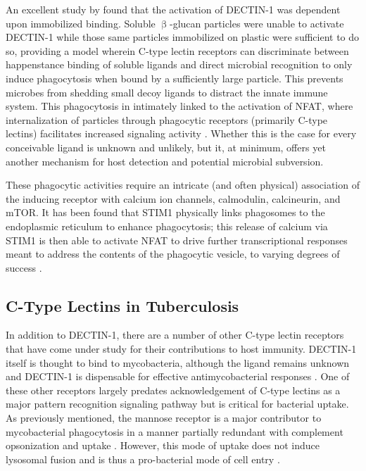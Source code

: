An excellent study by \citet{Goodridge2011} found that the activation of DECTIN\hyp{}1 was dependent upon immobilized binding. Soluble $\upbeta$\hyp{}glucan particles were unable to activate DECTIN\hyp{}1 while those same particles immobilized on plastic were sufficient to do so, providing a model wherein C\hyp{}type lectin receptors can discriminate between happenstance binding of soluble ligands and direct microbial recognition to only induce phagocytosis when bound by a sufficiently large particle. This prevents microbes from shedding small decoy ligands to distract the innate immune system. This phagocytosis in intimately linked to the activation of NFAT, where internalization of particles through phagocytic receptors (primarily C\hyp{}type lectins) facilitates increased signaling activity \citep{Fric2014}. Whether this is the case for every conceivable ligand is unknown and unlikely, but it, at minimum, offers yet another mechanism for host detection and potential microbial subversion.

These phagocytic activities require an intricate (and often physical) association of the inducing receptor with calcium ion channels, calmodulin, calcineurin, and mTOR. It has been found that STIM1 physically links phagosomes to the endoplasmic reticulum to enhance phagocytosis; this release of calcium via STIM1 is then able to activate NFAT to drive further transcriptional responses meant to address the contents of the phagocytic vesicle, to varying degrees of success \citep{Nunes2012}.

\subsection{C\hyp{}Type Lectins in Tuberculosis}

In addition to DECTIN\hyp{}1, there are a number of other C\hyp{}type lectin receptors that have come under study for their contributions to host immunity. DECTIN\hyp{}1 itself is thought to bind to mycobacteria, although the ligand remains unknown and DECTIN\hyp{}1 is dispensable for effective antimycobacterial responses \citep{Yadav2006, Schorey2008, Rothfuchs2007, Marakalala2011}. One of these other receptors largely predates acknowledgement of C\hyp{}type lectins as a major pattern recognition signaling pathway but is critical for bacterial uptake. As previously mentioned, the mannose receptor is a major contributor to mycobacterial phagocytosis in a manner partially redundant with complement opsonization and uptake \citep{Schlesinger1993, Kang1998b}. However, this mode of uptake does not induce lysosomal fusion and is thus a pro\hyp{}bacterial mode of cell entry \citep{AstarieDequeker1999, Goyal2016, Rajaram2017}. 

